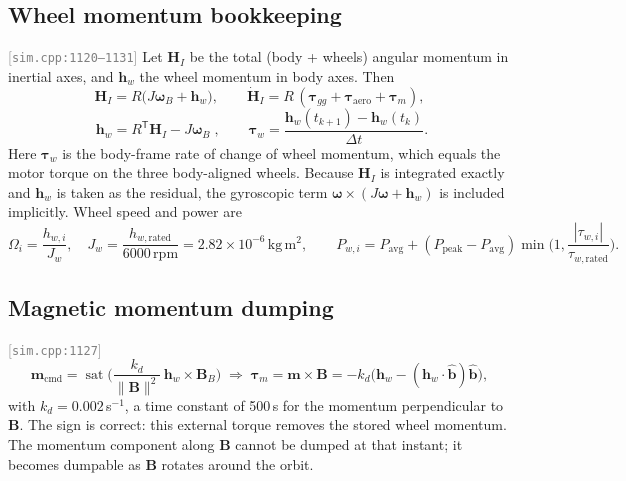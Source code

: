 \documentclass[11pt,a4paper]{article}
\newcommand{\vb}[1]{\boldsymbol{#1}}
\newcommand{\uv}[1]{\hat{\boldsymbol{#1}}}
\newcommand{\src}[1]{\textcolor{gray}{\small[\texttt{#1}]}}
\newcommand{\tp}{^{\mathsf{T}}}
\begin{document}
\subsection{Wheel momentum bookkeeping} \src{sim.cpp:1120--1131}
Let $\vb H_I$ be the total (body + wheels) angular momentum in inertial axes, and $\vb h_w$ the wheel momentum in body axes. Then
\begin{equation}
\vb H_I = R\big(J\vb\omega_B + \vb h_w\big),\qquad
\dot{\vb H}_I = R\,(\vb\tau_{gg} + \vb\tau_{\text{aero}} + \vb\tau_m),
\end{equation}
\begin{equation}
\boxed{\;\vb h_w = R\tp\vb H_I - J\vb\omega_B\;},\qquad
\vb\tau_w = \frac{\vb h_w(t_{k+1}) - \vb h_w(t_k)}{\Delta t}.
\end{equation}
Here $\vb\tau_w$ is the body-frame rate of change of wheel momentum, which equals the motor torque on the three body-aligned wheels. Because $\vb H_I$ is integrated exactly and $\vb h_w$ is taken as the residual, the gyroscopic term $\vb\omega\times(J\vb\omega + \vb h_w)$ is included implicitly. Wheel speed and power are
\begin{equation}
\Omega_i = \frac{h_{w,i}}{J_w},\quad J_w = \frac{h_{w,\text{rated}}}{6000\,\mathrm{rpm}} = 2.82\times10^{-6}\,\mathrm{kg\,m^2},\qquad
P_{w,i} = P_{\text{avg}} + (P_{\text{peak}} - P_{\text{avg}})\min\!\Big(1, \frac{|\tau_{w,i}|}{\tau_{w,\text{rated}}}\Big).
\end{equation}

\subsection{Magnetic momentum dumping} \src{sim.cpp:1127}
\begin{equation}
\vb m_{\text{cmd}} = \operatorname{sat}\!\Big(\frac{k_d}{\lVert\vb B\rVert^2}\,\vb h_w\times\vb B_B\Big)
\;\Rightarrow\;
\vb\tau_m = \vb m\times\vb B = -k_d\big(\vb h_w - (\vb h_w\cdot\uv b)\uv b\big),
\end{equation}
with $k_d = 0.002$\,s$^{-1}$, a time constant of 500\,s for the momentum perpendicular to $\vb B$. The sign is correct: this external torque removes the stored wheel momentum. The momentum component along $\vb B$ cannot be dumped at that instant; it becomes dumpable as $\vb B$ rotates around the orbit.
\end{document}

